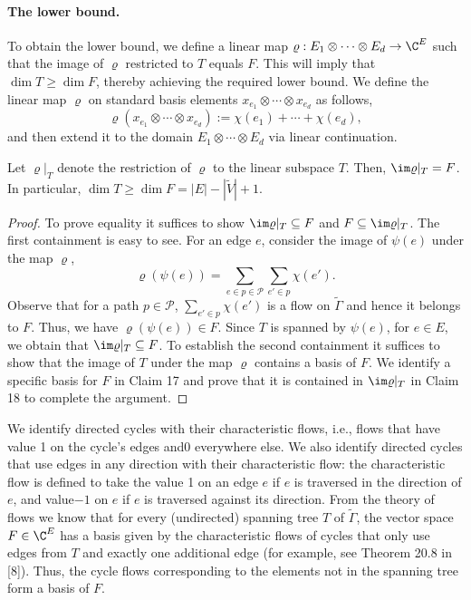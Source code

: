 \paragraph{The lower bound.}
To obtain the lower bound, we define a linear map $\varrho:E_1\otimes\cdots\otimes E_d\to\C^E$ such that the image of $\varrho$ restricted to $T$ equals $F$. This will imply that $\dim T\ge\dim F$, thereby achieving the required lower bound.
We define the linear map $\varrho$ on standard basis elements $x_{e_1}\otimes\cdots\otimes x_{e_d}$ as follows,
\[\varrho(x_{e_1}\otimes\cdots\otimes x_{e_d}):=\chi(e_1)+\cdots+\chi(e_d),\]
and then extend it to the domain $E_1\otimes\cdots\otimes E_d$ via linear continuation.
\begin{lemma}
Let $\varrho|_T$ denote the restriction of $\varrho$ to the linear subspace $T$. Then, $\im\varrho|_T=F$. In particular, $\dim T\ge\dim F=|E|-|\widetilde V|+1$.
\end{lemma}
\begin{proof}
To prove equality it suffices to show $\im\varrho|_T\subseteq F$ and $F\subseteq\im\varrho|_T$.
The first containment is easy to see. For an edge $e$, consider the image of $\psi(e)$ under the map $\varrho$,
\[\varrho(\psi(e))=\sum_{e\in p\in\mathcal P}\sum_{e'\in p}\chi(e').\]
Observe that for a path $p\in\mathcal P$, $\sum_{e'\in p}\chi(e')$ is a flow on $\widetilde\Gamma$ and hence it belongs to $F$. Thus, we have $\varrho(\psi(e))\in F$. Since $T$ is spanned by $\psi(e)$, for $e\in E$, we obtain that $\im\varrho|_T\subseteq F$.
To establish the second containment it suffices to show that the image of $T$ under the map $\varrho$ contains a basis of $F$. We identify a specific basis for $F$ in Claim 17 and prove that it is contained in $\im\varrho|_T$ in Claim 18 to complete the argument.
\end{proof}
We identify directed cycles with their characteristic flows, i.e., flows that have value 1 on the cycle's edges and0 everywhere else. We also identify directed cycles that use edges in any direction with their characteristic flow: the characteristic flow is defined to take the value 1 on an edge $e$ if $e$ is traversed in the direction of $e$, and value$-1$ on $e$ if $e$ is traversed against its direction.
From the theory of flows we know that for every (undirected) spanning tree $T$ of $\widetilde\Gamma$, the vector space $F\in\C^E$ has a basis given by the characteristic flows of cycles that only use edges from $T$ and exactly one additional edge (for example, see Theorem 20.8 in [8]). Thus, the cycle flows corresponding to the elements not in the spanning tree form a basis of $F$.

